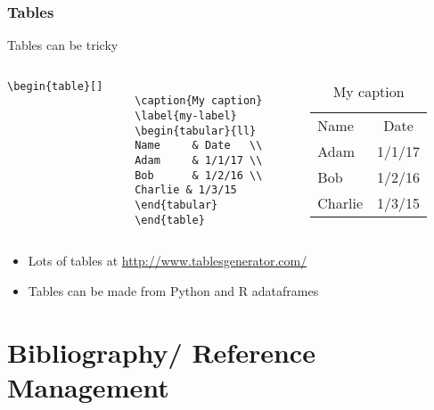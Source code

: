 \documentclass[xcolor={svgnames},
hyperref={colorlinks,citecolor=DeepPink4,linkcolor=DarkRed,urlcolor=DarkBlue}
]{beamer}
\begin{document}
	\begin{frame}[fragile]
		\frametitle{Tables}
		\begin{block}{Tables can be tricky}
			\begin{columns}
				\begin{column}{0.4\textwidth}
					\begin{Verbatim}[fontsize=\small]
					\begin{table}[]
					\caption{My caption}
					\label{my-label}
					\begin{tabular}{ll}
					Name     & Date   \\
					Adam     & 1/1/17 \\
					Bob      & 1/2/16 \\
					Charlie & 1/3/15
					\end{tabular}
					\end{table}
					\end{Verbatim}
				\end{column}
				\begin{column}{0.4\textwidth}
					\begin{table}[]
						\caption{My caption}
						\label{tbl:my-label}
						\begin{tabular}{|l|c|}
							Name     & Date   \\
							Adam     & 1/1/17 \\
							Bob      & 1/2/16 \\
							Charlie & 1/3/15
						\end{tabular}
					\end{table}
				\end{column}
			\end{columns}
		\end{block}
		
		\begin{itemize}
			\item Lots of tables at \url{http://www.tablesgenerator.com/}
			\item Tables can be made from Python and R adataframes
		\end{itemize}
	\end{frame}
	
	\section{Bibliography/ Reference Management}
\end{document}
